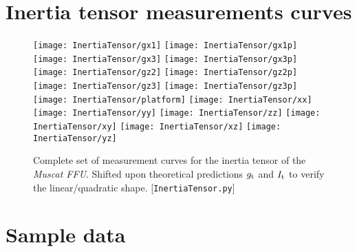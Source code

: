 \documentclass[journal]{IEEEtran}
\begin{document}
\onecolumn

\section{Inertia tensor measurements curves}

\begin{figure}[h]
	\centering
	\texttt{[image: InertiaTensor/gx1]}
	\texttt{[image: InertiaTensor/gx1p]}
	\texttt{[image: InertiaTensor/gx3]}
	\texttt{[image: InertiaTensor/gx3p]}
	\texttt{[image: InertiaTensor/gz2]}
	\texttt{[image: InertiaTensor/gz2p]}
	\texttt{[image: InertiaTensor/gz3]}
	\texttt{[image: InertiaTensor/gz3p]}
	\texttt{[image: InertiaTensor/platform]}
	\texttt{[image: InertiaTensor/xx]}
	\texttt{[image: InertiaTensor/yy]}
	\texttt{[image: InertiaTensor/zz]}
	\texttt{[image: InertiaTensor/xy]}
	\texttt{[image: InertiaTensor/xz]}
	\texttt{[image: InertiaTensor/yz]}
	\caption{Complete set of measurement curves for the inertia tensor of the \emph{Muscat FFU}. Shifted upon theoretical predictions $g_{\textup{t}}$ and $I_{\textup{t}}$ to verify the linear/quadratic shape. [\texttt{InertiaTensor.py}]}
	\label{fig:FFU}
\end{figure}


\clearpage

\section{Sample data}


\end{document}

